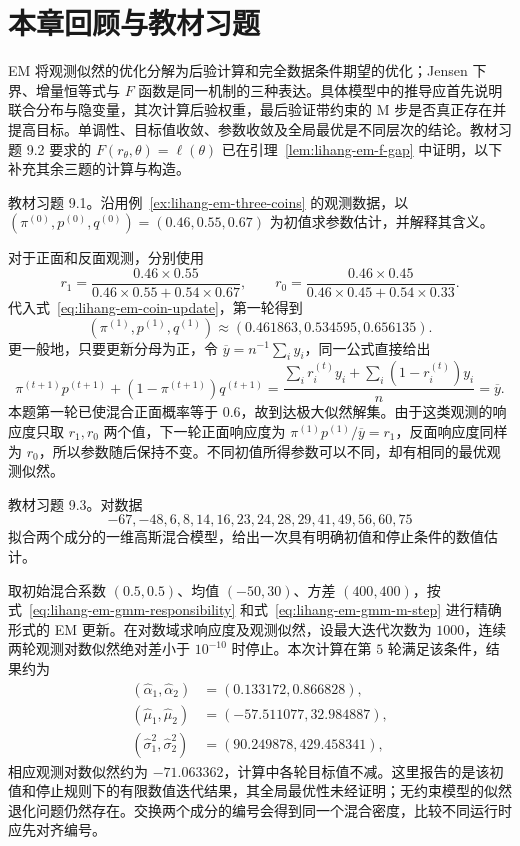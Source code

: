 \section*{本章回顾与教材习题}

EM 将观测似然的优化分解为后验计算和完全数据条件期望的优化；Jensen 下界、增量恒等式与 $F$ 函数是同一机制的三种表达。具体模型中的推导应首先说明联合分布与隐变量，其次计算后验权重，最后验证带约束的 M 步是否真正存在并提高目标。单调性、目标值收敛、参数收敛及全局最优是不同层次的结论。教材习题 9.2 要求的 $F(r_\theta,\theta)=\ell(\theta)$ 已在引理~\ref{lem:lihang-em-f-gap} 中证明，以下补充其余三题的计算与构造。

\begin{example}
\label{ex:lihang-em-coin-exercise}
教材习题 9.1。沿用例~\ref{ex:lihang-em-three-coins} 的观测数据，以 $(\pi^{(0)},p^{(0)},q^{(0)})=(0.46,0.55,0.67)$ 为初值求参数估计，并解释其含义。
\end{example}

\begin{solve}
对于正面和反面观测，分别使用
\[
  r_1=\frac{0.46\times0.55}{0.46\times0.55+0.54\times0.67},\qquad
  r_0=\frac{0.46\times0.45}{0.46\times0.45+0.54\times0.33}.
\]
代入式~\eqref{eq:lihang-em-coin-update}，第一轮得到
\[
  (\pi^{(1)},p^{(1)},q^{(1)})
  \approx(0.461863,0.534595,0.656135).
\]
更一般地，只要更新分母为正，令 $\overline y=n^{-1}\sum_i y_i$，同一公式直接给出
\[
  \pi^{(t+1)}p^{(t+1)}
  +(1-\pi^{(t+1)})q^{(t+1)}
  =\frac{\sum_i r_i^{(t)}y_i+\sum_i(1-r_i^{(t)})y_i}{n}
  =\overline y.
\]
本题第一轮已使混合正面概率等于 $0.6$，故到达极大似然解集。由于这类观测的响应度只取 $r_1,r_0$ 两个值，下一轮正面响应度为 $\pi^{(1)}p^{(1)}/\overline y=r_1$，反面响应度同样为 $r_0$，所以参数随后保持不变。不同初值所得参数可以不同，却有相同的最优观测似然。
\end{solve}

\begin{example}
\label{ex:lihang-em-gmm-exercise}
教材习题 9.3。对数据
\[
  -67,-48,6,8,14,16,23,24,28,29,41,49,56,60,75
\]
拟合两个成分的一维高斯混合模型，给出一次具有明确初值和停止条件的数值估计。
\end{example}

\begin{solve}
取初始混合系数 $(0.5,0.5)$、均值 $(-50,30)$、方差 $(400,400)$，按式~\eqref{eq:lihang-em-gmm-responsibility} 和式~\eqref{eq:lihang-em-gmm-m-step} 进行精确形式的 EM 更新。在对数域求响应度及观测似然，设最大迭代次数为 $1000$，连续两轮观测对数似然绝对差小于 $10^{-10}$ 时停止。本次计算在第 $5$ 轮满足该条件，结果约为
\[
  \begin{aligned}
    (\widehat\alpha_1,\widehat\alpha_2)&=(0.133172,0.866828),\\
    (\widehat\mu_1,\widehat\mu_2)&=(-57.511077,32.984887),\\
    (\widehat\sigma_1^2,\widehat\sigma_2^2)&=(90.249878,429.458341),
  \end{aligned}
\]
相应观测对数似然约为 $-71.063362$，计算中各轮目标值不减。这里报告的是该初值和停止规则下的有限数值迭代结果，其全局最优性未经证明；无约束模型的似然退化问题仍然存在。交换两个成分的编号会得到同一个混合密度，比较不同运行时应先对齐编号。
\end{solve}

